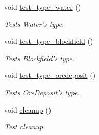 \begin{DoxyCompactItemize}
void \hyperlink{classdefault__tile_a086986610e729ee878f8c68b4b19d10b}{test\-\_\-type\-\_\-water} ()
\begin{DoxyCompactList}\small\item\em Tests Water's type. \end{DoxyCompactList}\item 
void \hyperlink{classdefault__tile_a6612daefb98dbb72a1860264b87f0dbb}{test\-\_\-type\-\_\-blockfield} ()
\begin{DoxyCompactList}\small\item\em Tests Blockfield's type. \end{DoxyCompactList}\item 
void \hyperlink{classdefault__tile_a05d5665f788e8d38f6708725c9ee946b}{test\-\_\-type\-\_\-oredeposit} ()
\begin{DoxyCompactList}\small\item\em Tests Ore\-Deposit's type. \end{DoxyCompactList}\item 
void \hyperlink{classdefault__tile_ab2c7a242550d5a341cfbef3cb9d83990}{cleanup} ()
\begin{DoxyCompactList}\small\item\em Test cleanup. \end{DoxyCompactList}\end{DoxyCompactItemize}
